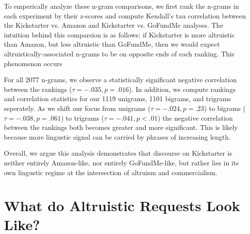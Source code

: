 \documentclass[letterpaper]{article}
\begin{document}
To emperically analyze these n-gram comparisons, we first rank the n-grams in each experiment by their z-scores and compute Kendall's tau correlation between the Kickstarter vs. Amazon and Kickstarter vs. GoFundMe analyses. The intuition behind this comparsion is as follows: if Kickstarter is more altruistic than Amazon, but less altruistic than GoFundMe, then we would expect altruistically-associated n-grams to be on opposite ends of each ranking. This phenomenon occurs 

For all 2077 n-grams, we observe a statistically significant negative correlation between the rankings ($\tau = -.035, p = .016$). In addition, we compute rankings and correlation statistics for our 1119 unigrams, 1101 bigrams, and trigrams seperately. As we shift our focus from unigrams ($\tau = -.024, p = .23$) to bigrams ($\tau = -.038, p = .061$) to trigrams ($\tau = -.041, p < .01$) the negative correlation between the rankings both becomes greater and more significant. This is likely because more lingustic signal can be carried by phrases of increasing length.

Overall, we argue this analysis demonstrates that discourse on Kickstarter is neither entirely Amazon-like, nor entirely GoFundMe-like, but rather lies in its own lingustic regime at the intersection of altruism and commercialism.
\section{What do Altruistic Requests Look Like?}
\end{document}
